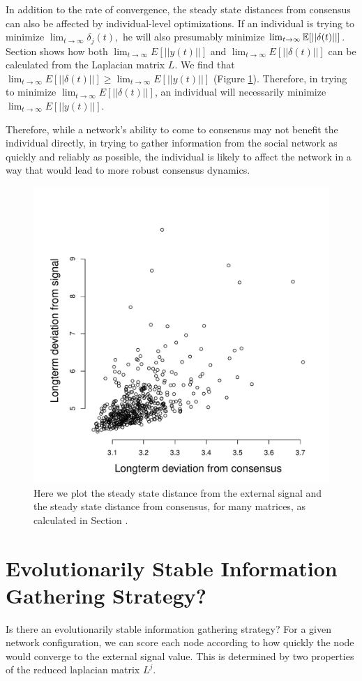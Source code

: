 \documentclass{article}
\begin{document}
In addition to the rate of convergence, the steady state distances from consensus can also be affected by individual-level optimizations.  If an individual is trying to minimize $\lim_{t\to\infty}\delta_j(t),$ he will also presumably minimize $\lim_{t\to\infty}{\mathbb{E}}[||\delta(t)||]$.  Section  shows how both $\lim_{t\to\infty}E[||y(t)||]$ and $\lim_{t\to\infty}E[||\delta(t)||]$ can be calculated from the Laplacian matrix $L$.  We find that $\lim_{t\to\infty}E[||\delta(t)||]\geq \lim_{t\to\infty}E[||y(t)||]$ (Figure \ref{lyap_comparison}).  Therefore, in trying to minimize $\lim_{t\to\infty}E[||\delta(t)||]$, an individual will necessarily minimize $\lim_{t\to\infty}E[||y(t)||]$.

Therefore, while a network's ability to come to consensus may not benefit the individual directly, in trying to gather information from the social network as quickly and reliably as possible, the individual is likely to affect the network in a way that would lead to more robust consensus dynamics.

\begin{figure}
\begin{center}
\includegraphics[width=.75\textwidth]{deviations.pdf}
\end{center}
\caption{\label{lyap_comparison} Here we plot the steady state distance from the external signal and the steady state distance from consensus, for many matrices, as calculated in Section .}
\end{figure}

\section{Evolutionarily Stable Information Gathering Strategy?}
Is there an evolutionarily stable information gathering strategy?  For a given network configuration, we can score each node according to how quickly the node would converge to the external signal value.  This is determined by two properties of the reduced laplacian matrix $L^j$.  
\end{document}
